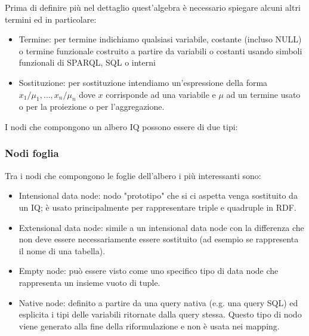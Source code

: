 Prima di definire più nel dettaglio quest'algebra è necessario spiegare alcuni altri termini ed in particolare:
\begin{itemize}
    \item Termine: per termine indichiamo qualsiasi variabile, costante (incluso NULL) o termine funzionale costruito a partire da variabili o costanti usando simboli funzionali di SPARQL, SQL o interni
    \item Sostituzione: per sostituzione intendiamo un'espressione della forma \linebreak
        $x_1/\mu_1 , \dots , x_n/\mu_n $ dove $x$ corrisponde ad una variabile e $\mu$ ad un termine usato o per la proiezione o per l'aggregazione.
\end{itemize} 
\noindent
I nodi che compongono un albero IQ possono essere di due tipi: \cite{IQ}
\subsubsection*{Nodi foglia} 
Tra i nodi che compongono le foglie dell'albero i più interessanti sono:
    \begin{itemize}
        \item Intensional data node: nodo "prototipo" che si ci aspetta venga sostituito da un IQ; è usato principalmente per rappresentare triple e quadruple in RDF.
        \item Extensional data node: simile a un intensional data node con la differenza che non deve essere necessariamente essere sostituito (ad esempio se rappresenta il nome di una tabella).
        \item Empty node: può essere visto come uno specifico tipo di data node che rappresenta un insieme vuoto di tuple.
        \item Native node: definito a partire da una query nativa (e.g. una query SQL) ed esplicita i tipi delle variabili ritornate dalla query stessa. Questo tipo di nodo viene generato alla fine 
            della riformulazione e non è usata nei mapping.
    \end{itemize}
